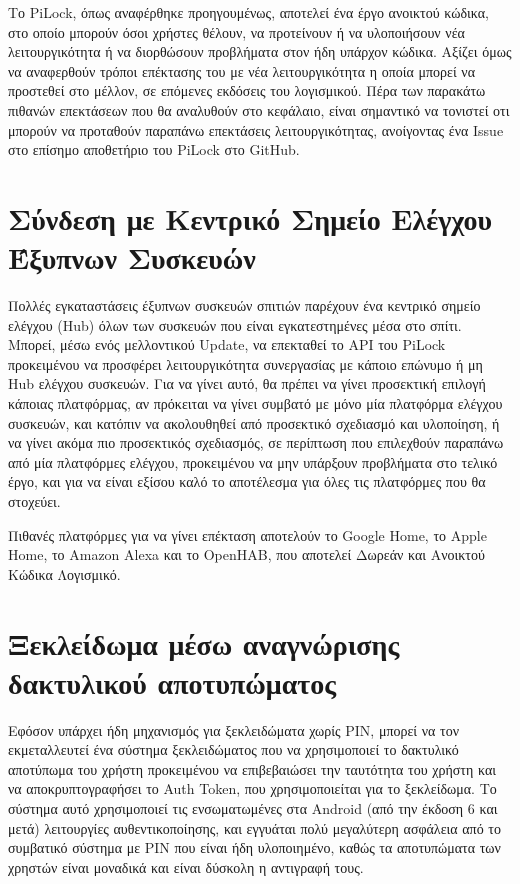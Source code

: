 \label{ch:future_expansion}
Το PiLock, όπως αναφέρθηκε προηγουμένως, αποτελεί ένα έργο ανοικτού κώδικα, στο οποίο μπορούν όσοι χρήστες θέλουν, να προτείνουν ή να υλοποιήσουν νέα λειτουργικότητα ή να διορθώσουν προβλήματα στον ήδη υπάρχον κώδικα. Αξίζει όμως να αναφερθούν τρόποι επέκτασης του με νέα λειτουργικότητα η οποία μπορεί να προστεθεί στο μέλλον, σε επόμενες εκδόσεις του λογισμικού. Πέρα των παρακάτω πιθανών επεκτάσεων που θα αναλυθούν στο κεφάλαιο, είναι σημαντικό να τονιστεί οτι μπορούν να προταθούν παραπάνω επεκτάσεις λειτουργικότητας, ανοίγοντας ένα Issue στο επίσημο αποθετήριο του PiLock στο GitHub.  %

\section{Σύνδεση με Κεντρικό Σημείο Ελέγχου Έξυπνων Συσκευών}
	Πολλές εγκαταστάσεις έξυπνων συσκευών σπιτιών παρέχουν ένα κεντρικό σημείο ελέγχου (Hub) όλων των συσκευών που είναι εγκατεστημένες μέσα στο σπίτι. Μπορεί, μέσω ενός μελλοντικού Update, να επεκταθεί το API του PiLock προκειμένου να προσφέρει λειτουργικότητα συνεργασίας με κάποιο επώνυμο ή μη Hub ελέγχου συσκευών. Για να γίνει αυτό, θα πρέπει να γίνει προσεκτική επιλογή κάποιας πλατφόρμας, αν πρόκειται να γίνει συμβατό με μόνο μία πλατφόρμα ελέγχου συσκευών, και κατόπιν να ακολουθηθεί από προσεκτικό σχεδιασμό και υλοποίηση, ή να γίνει ακόμα πιο προσεκτικός σχεδιασμός, σε περίπτωση που επιλεχθούν παραπάνω από μία πλατφόρμες ελέγχου, προκειμένου να μην υπάρξουν προβλήματα στο τελικό έργο, και για να είναι εξίσου καλό το αποτέλεσμα για όλες τις πλατφόρμες που θα στοχεύει.

	Πιθανές πλατφόρμες για να γίνει επέκταση αποτελούν το Google Home, το Apple Home, το Amazon Alexa και το OpenHAB, που αποτελεί Δωρεάν και Ανοικτού Κώδικα Λογισμικό.

\section{Ξεκλείδωμα μέσω αναγνώρισης δακτυλικού αποτυπώματος}
	Εφόσον υπάρχει ήδη μηχανισμός για ξεκλειδώματα χωρίς PIN, μπορεί να τον εκμεταλλευτεί ένα σύστημα ξεκλειδώματος που να χρησιμοποιεί το δακτυλικό αποτύπωμα του χρήστη προκειμένου να επιβεβαιώσει την ταυτότητα του χρήστη και να αποκρυπτογραφήσει το Auth Token, που χρησιμοποιείται για το ξεκλείδωμα. Το σύστημα αυτό χρησιμοποιεί τις ενσωματωμένες στα Android (από την έκδοση 6 και μετά) λειτουργίες αυθεντικοποίησης, και εγγυάται πολύ μεγαλύτερη ασφάλεια από το συμβατικό σύστημα με PIN που είναι ήδη υλοποιημένο, καθώς τα αποτυπώματα των χρηστών είναι μοναδικά και είναι δύσκολη η αντιγραφή τους.

